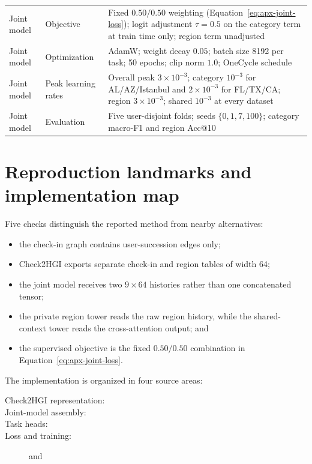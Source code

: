 {\begin{longtable}{>{\raggedright\arraybackslash}p{}
                  >{\raggedright\arraybackslash}p{}
                  >{\raggedright\arraybackslash}p{}}
Joint model & Objective & Fixed $0.50/0.50$ weighting (Equation~\ref{eq:apx-joint-loss}); logit adjustment $\tau=0.5$ on the category term at train time only; region term unadjusted \\
Joint model & Optimization & AdamW; weight decay $0.05$; batch size 8192 per task; 50 epochs; clip norm $1.0$; OneCycle schedule \\
Joint model & Peak learning rates & Overall peak $3\times10^{-3}$; category $10^{-3}$ for AL/AZ/Istanbul and $2\times10^{-3}$ for FL/TX/CA; region $3\times10^{-3}$; shared $10^{-3}$ at every dataset \\
Joint model & Evaluation & Five user-disjoint folds; seeds $\{0,1,7,100\}$; category macro-F1 and region Acc@10 \\
\bottomrule
\end{longtable}
}

\section{Reproduction landmarks and implementation map}
\label{sec:apx-methods-reproduction}

Five checks distinguish the reported method from nearby alternatives:
\begin{itemize}
    \item the check-in graph contains user-succession edges only;
    \item Check2HGI exports separate check-in and region tables of width 64;
    \item the joint model receives two $9\times64$ histories rather than one
    concatenated tensor;
    \item the private region tower reads the raw region history, while the
    shared-context tower reads the cross-attention output; and
    \item the supervised objective is the fixed $0.50/0.50$ combination in
    Equation~\ref{eq:apx-joint-loss}.
\end{itemize}

The implementation is organized in four source areas:
{\small
\begin{description}
    \item[Check2HGI representation:] 
    \item[Joint-model assembly:] 
    \item[Task heads:] 
    \item[Loss and training:]  and 
\end{description}
}
